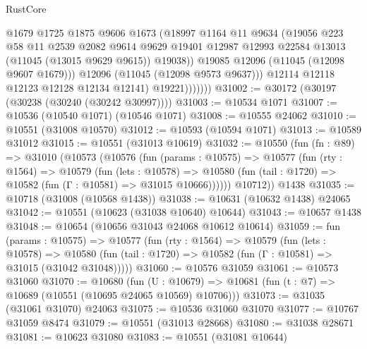 \begin{lexlean}{RustCore}
\begin{coremodule}
                        @1679
                        @1725
                        @1875
                        @9606
                        @1673
                        (@18997
                          @1164
                          @11
                          @9634
                          (@19056
                            @223
                            @58
                            @11
                            @2539
                            @2082
                            @9614
                            @9629
                            @19401
                            @12987
                            @12993
                            @22584
                            @13013
                            (@11045 (@13015 @9629 @9615))
                            @19038))
                        @19085
                        @12096
                        (@11045 (@12098 @9607 @1679)))
                      @12096
                      (@11045 (@12098 @9573 @9637)))
                    @12114
                    @12118
                    @12123
                    @12128
                    @12134
                    @12141)
                  @19221)))))))
@31002 := @30172 (@30197 (@30238 (@30240 (@30242 @30997))))
@31003 := @10534 @1071
@31007 := @10536 (@10540 @1071) (@10546 @1071)
@31008 := @10555 @24062
@31010 := @10551 (@31008 @10570)
@31012 := @10593 (@10594 @1071)
@31013 := @10589 @31012
@31015 := @10551 (@31013 @10619)
@31032 := @10550
    (fun (fn : @89) =>
    @31010
      (@10573
        (@10576
          (fun (params : @10575) =>
          @10577
            (fun (rty : @1564) =>
            @10579
              (fun (lets : @10578) =>
              @10580 (fun (tail : @1720) => @10582 (fun (Γ : @10581) => @31015 @10666))))))
        @10712))
    @1438
@31035 := @10718 (@31008 (@10568 @1438))
@31038 := @10631 (@10632 @1438) @24065
@31042 := @10551 (@10623 (@31038 @10640) @10644)
@31043 := @10657 @1438
@31048 := @10654 (@10656 @31043 @24068 @10612 @10614)
@31059 := fun (params : @10575) =>
  @10577
    (fun (rty : @1564) =>
    @10579
      (fun (lets : @10578) =>
      @10580 (fun (tail : @1720) => @10582 (fun (Γ : @10581) => @31015 (@31042 @31048)))))
@31060 := @10576 @31059
@31061 := @10573 @31060
@31070 := @10680
    (fun (U : @10679) => @10681 (fun (t : @7) => @10689 (@10551 (@10695 @24065 @10569) @10706)))
@31073 := @31035 (@31061 @31070) @24063
@31075 := @10536 @31060 @31070
@31077 := @10767 @31059 @8474
@31079 := @10551 (@31013 @28668)
@31080 := @31038 @28671
@31081 := @10623 @31080
@31083 := @10551 (@31081 @10644)

\end{coremodule}
\end{lexlean}
